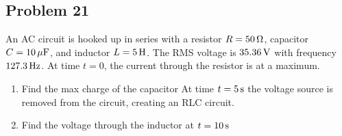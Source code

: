 \subsection*{Problem 21}
An AC circuit is hooked up in series with a resistor $R = 50\,\mathrm{\Omega}$, capacitor
$C = 10\,\mathrm{\mu F}$, and inductor $L = 5\,\mathrm{H}$. The RMS voltage is $35.36\,\mathrm{V}$ with frequency
$127.3\,\mathrm{Hz}$. At time $t = 0$, the current through the resistor is at a maximum.
\begin{enumerate}
    \item Find the max charge of the capacitor
    At time $t = 5\,\mathrm{s}$ the voltage source is removed from the circuit, creating an RLC
    circuit.
    \item Find the voltage through the inductor at $t = 10\,\mathrm{s}$
\end{enumerate}

